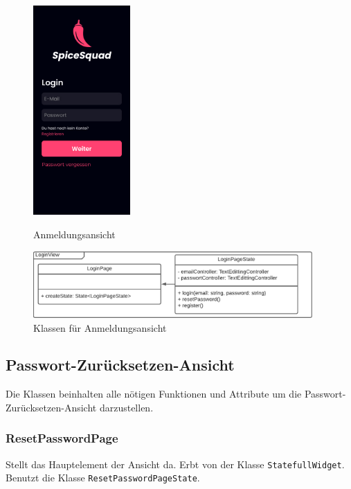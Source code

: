 \documentclass[parskip=full]{scrartcl}
\begin{document}
    \begin{figure}[htp]
        \begin{minipage}
            [t]{0.49\textwidth}
            \centering
            \includegraphics[height=80mm]{images/Presentation-layer/LoginView.jpg}
            \caption{Anmeldungsansicht}
        \end{minipage}
        \begin{minipage}
            [t]{0.49\textwidth}
            \centering
            \includegraphics[width=0.95\textwidth]{images/Presentation-layer/LoginViewClass.pdf}
            \caption{Klassen für Anmeldungsansicht}
        \end{minipage}
    \end{figure}    
        
    \newpage

\subsection{Passwort-Zurücksetzen-Ansicht}
    Die Klassen beinhalten alle nötigen Funktionen und Attribute um die Passwort-Zurücksetzen-Ansicht darzustellen.
    
    \subsubsection{ResetPasswordPage}
        Stellt das Hauptelement der Ansicht da. Erbt von der Klasse \texttt{StatefullWidget}. Benutzt die Klasse \texttt{ResetPasswordPageState}. 
\end{document}
